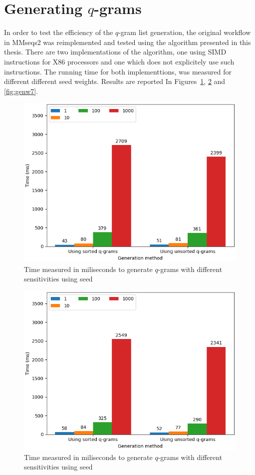 \documentclass[twoside,a4paper,bsc]{master}
\newcommand{\Qgram}[1]{\(#1\)-gram}
\begin{document}
\section{Generating \Qgram{q}s}
In order to test the efficiency of the \Qgram{q} list generation, the
original workflow in MMseqs2 was reimplemented and tested using the
algorithm presented in this thesis. There are two implementations of
the algorithm, one using SIMD instructions for X86 processors and one
which does not explicitely use such instructions.
The running time for both implementtions, was measured for different
different seed weights. Results are reported In
Figures~\ref{fig:genw5}, \ref{fig:genw6} and \ref{fig:genw7}.
\begin{figure}
\centering
\includegraphics[scale=0.6]{graphics/gen_w5.png}
\caption{Time measured in miliseconds to generate \Qgram{q}s with
different sensitivities using seed }
\label{fig:genw5}
\end{figure}
\begin{figure}
\centering
\includegraphics[scale=0.6]{graphics/gen_w6.png}
\caption{Time measured in miliseconds to generate \Qgram{q}s with
different sensitivities using seed }
\label{fig:genw6}
\end{figure}
\end{document}
